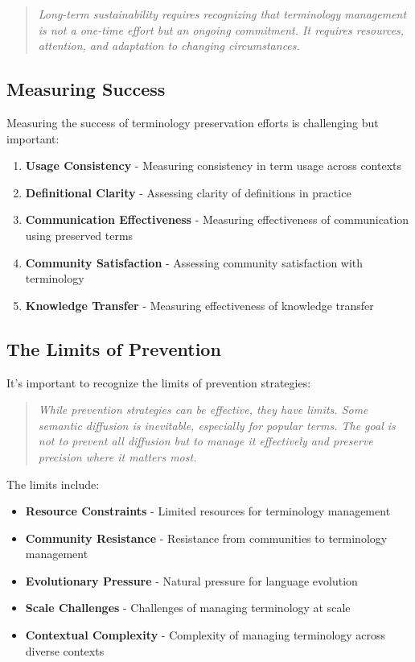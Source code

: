 \documentclass[11pt]{article}
\begin{document}
\begin{quote}
\emph{Long-term sustainability requires recognizing that terminology management is not a one-time effort but an ongoing commitment. It requires resources, attention, and adaptation to changing circumstances.}
\end{quote}

\subsection{Measuring Success}

Measuring the success of terminology preservation efforts is challenging but important:

\begin{enumerate}
\item \textbf{Usage Consistency} - Measuring consistency in term usage across contexts
\item \textbf{Definitional Clarity} - Assessing clarity of definitions in practice
\item \textbf{Communication Effectiveness} - Measuring effectiveness of communication using preserved terms
\item \textbf{Community Satisfaction} - Assessing community satisfaction with terminology
\item \textbf{Knowledge Transfer} - Measuring effectiveness of knowledge transfer
\end{enumerate}

\subsection{The Limits of Prevention}

It's important to recognize the limits of prevention strategies:

\begin{quote}
\emph{While prevention strategies can be effective, they have limits. Some semantic diffusion is inevitable, especially for popular terms. The goal is not to prevent all diffusion but to manage it effectively and preserve precision where it matters most.}
\end{quote}

The limits include:

\begin{itemize}
\item \textbf{Resource Constraints} - Limited resources for terminology management
\item \textbf{Community Resistance} - Resistance from communities to terminology management
\item \textbf{Evolutionary Pressure} - Natural pressure for language evolution
\item \textbf{Scale Challenges} - Challenges of managing terminology at scale
\item \textbf{Contextual Complexity} - Complexity of managing terminology across diverse contexts
\end{itemize}
\end{document}
